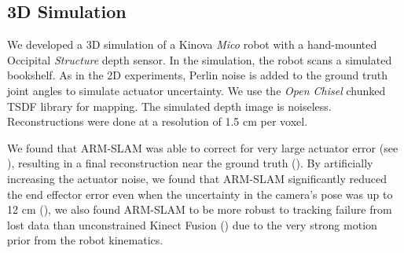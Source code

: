 \subsection{3D Simulation}
\label{sec:3d_sim}

We developed a 3D simulation of a Kinova \textit{Mico} robot with a hand-mounted Occipital \textit{Structure} \cite{StructureSensor} depth sensor. In the simulation, the robot scans a simulated bookshelf. As in the 2D experiments, Perlin noise is added to the ground truth joint angles to simulate actuator uncertainty. We use the \textit{Open Chisel} \cite{Klingensmith2015} chunked {TSDF} library for mapping. The simulated depth image is noiseless. Reconstructions were done at a resolution of 1.5 cm per voxel.

We found that ARM-SLAM was able to correct for very large actuator error (see ), resulting in a final reconstruction near the ground truth (). By artificially increasing the actuator noise, we found that ARM-SLAM significantly reduced the end effector error even when the uncertainty in the camera's pose was up to 12 cm (), we also found ARM-SLAM to be more robust to tracking failure from lost data than unconstrained Kinect Fusion () due to the very strong motion prior from the robot kinematics.

